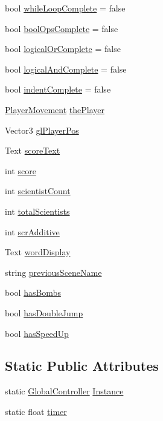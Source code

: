 \begin{DoxyCompactItemize}
\item 
bool \hyperlink{class_global_controller_a60806c4e71e7aab4127aca365a359b2d}{while\+Loop\+Complete} = false
\item 
bool \hyperlink{class_global_controller_a9486246c8e066ebc7d21633cba31d6a9}{bool\+Ops\+Complete} = false
\item 
bool \hyperlink{class_global_controller_a2f07e222a9f964dcf7fc1417f715da92}{logical\+Or\+Complete} = false
\item 
bool \hyperlink{class_global_controller_a8462e396ae3aa7f7616b0f101b5fb89c}{logical\+And\+Complete} = false
\item 
bool \hyperlink{class_global_controller_a150accbef592e8c2e099d8b7a109bbc5}{indent\+Complete} = false
\item 
\hyperlink{class_player_movement}{Player\+Movement} \hyperlink{class_global_controller_a801f782511818beca77fc2dbd425408d}{the\+Player}
\item 
Vector3 \hyperlink{class_global_controller_a7017a9cd75e3d669ccc9750174d054bd}{gl\+Player\+Pos}
\item 
Text \hyperlink{class_global_controller_ab792e99bb983f76fdccd852181c5d57a}{score\+Text}
\item 
int \hyperlink{class_global_controller_aced28959bd33c639a9d5a0d09a402cbf}{score}
\item 
int \hyperlink{class_global_controller_a48edc8164385a8fc43093ffa9805b3cb}{scientist\+Count}
\item 
int \hyperlink{class_global_controller_ad02eba986e29262743629b40f12372e7}{total\+Scientists}
\item 
int \hyperlink{class_global_controller_a943a3c4c7e4618dbeffb3870d97a0b68}{scr\+Additive}
\item 
Text \hyperlink{class_global_controller_a8140e86b843db24566ec5fbf223eeafa}{word\+Display}
\item 
string \hyperlink{class_global_controller_a4f18181ee209689f12548533bbe5a6a7}{previous\+Scene\+Name}
\item 
bool \hyperlink{class_global_controller_a9ee52888965cba7e6c237d44e0b19c53}{has\+Bombs}
\item 
bool \hyperlink{class_global_controller_ad507e74326e2dc42ce799dba48c27a06}{has\+Double\+Jump}
\item 
bool \hyperlink{class_global_controller_ab7b42d69b264a591d1634da4c3d1866f}{has\+Speed\+Up}
\end{DoxyCompactItemize}
\subsection*{Static Public Attributes}
\begin{DoxyCompactItemize}
\item 
static \hyperlink{class_global_controller}{Global\+Controller} \hyperlink{class_global_controller_a1b49b6838d496def8e3968bdd5dc13ae}{Instance}
\item 
static float \hyperlink{class_global_controller_a93fd9586e6406cde652c06fda4c4d7be}{timer}
\end{DoxyCompactItemize}


